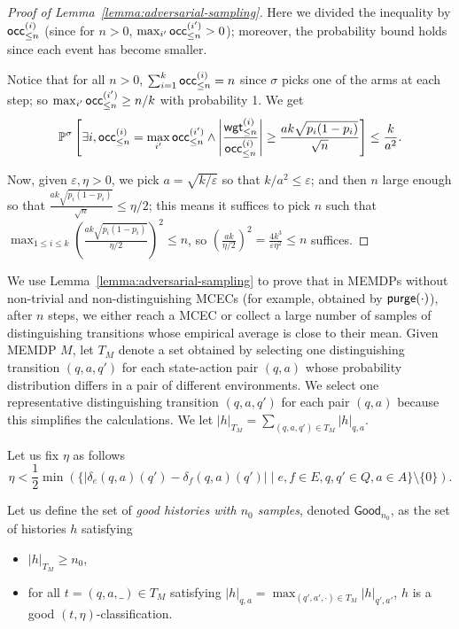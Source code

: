 \documentclass[a4paper,USenglish,cleveref, autoref, thm-restate]{lipics-v2021}
\let\epsilon\varepsilon
\def\abs#1{\ensuremath{\lvert #1 \rvert}}
\newcommand*{\pr}{\mathbb{P}}
\def\Good{\textsf{Good}}
\def\Act{A}
\def\wgt{\textrm{\sf wgt}}
\def\occ{\textrm{\sf occ}}
\newcommand\purge[1]{\textrm{\sf purge}(#1)}
\begin{document}
\begin{proof}[Proof of Lemma~\ref{lemma:adversarial-sampling}]
  Here we divided the inequality by $\occ^{(i)}_{\leq n}$ (since for $n>0$, $\max_{i'}\occ_{\leq n}^{(i')}>0$);
  moreover, the probability bound holds since each event has become smaller.
  
  Notice that for all $n>0$, $\sum_{i=1}^k \occ_{\leq n}^{(i)}=n$ since $\sigma$ picks one of the arms at each step;
  so $\max_{i'}\occ_{\leq n}^{(i')} \geq n/k$ with probability 1. 
  We get
  \[
    \pr^\sigma\left[ 
      \exists i, 
      \occ_{\leq n}^{(i)} = \max_{i'}\occ_{\leq n}^{(i')}
      \land \left\lvert\frac{\wgt^{(i)}_{\leq n}}{\occ^{(i)}_{\leq n}}\right\rvert 
              \geq \frac{ak\sqrt{p_i(1-p_i)}}{\sqrt{n}} \right] 
        \leq \frac{k}{a^2}.
  \]

  Now, given $\epsilon,\eta>0$, we pick $a=\sqrt{k/\epsilon}$ so that $k/a^2\leq \epsilon$; and then $n$ large enough so that 
$\frac{ak\sqrt{p_i(1-p_i)}}{\sqrt{n}}\leq \eta/2$; this means it suffices to pick $n$ such that
\(
  \max_{1\leq i \leq k}\left(\frac{ak \sqrt{p_i(1-p_i)}}{\eta/2}\right)^2 \leq n
\), so $(\frac{ak}{\eta/2})^2 = \frac{4k^3}{\epsilon\eta^2} \leq n$ suffices. 
\end{proof}


We use Lemma~\ref{lemma:adversarial-sampling} to prove that in MEMDPs without non-trivial and non-distinguishing MCECs (for example, obtained by $\purge{\cdot}$),
after $n$ steps, we either reach a MCEC or collect a large number of samples of distinguishing transitions whose empirical average is close to their mean.
Given MEMDP $M$, let $T_M$ denote a set obtained by selecting one distinguishing transition $(q,a,q')$ for each state-action pair $(q,a)$ whose probability 
distribution differs in a pair of different environments.
We select one representative distinguishing transition $(q,a,q')$ for each pair $(q,a)$ because this simplifies the calculations.
We let $\abs{h}_{T_M} = \sum_{(q,a,q') \in T_M}\abs{h}_{q,a}$.

Let us fix $\eta$ as follows
\[
  \eta<\frac{1}{2}\min\left(\{\abs{\delta_e(q,a)(q') - \delta_{f}(q,a)(q')} \mid e,f \in E, q,q'\in Q, a \in \Act\}\setminus\{0\}\right).
\]

\def\good{\textrm{\sf Good}}
Let us define the set of \emph{good histories with $n_0$ samples}, denoted $\Good_{n_0}$, as the set of histories $h$ satisfying
\begin{itemize}
  \item $\abs{h}_{T_M}\geq n_0$,
  \item for all $t=(q,a,\_)\in T_M$ satisfying $\abs{h}_{q,a} {=} \max_{(q',a',\cdot) \in T_M} \abs{h}_{q',a'}$, 
  $h$ is a good $(t,\eta)$-classification.
\end{itemize}
\end{document}
